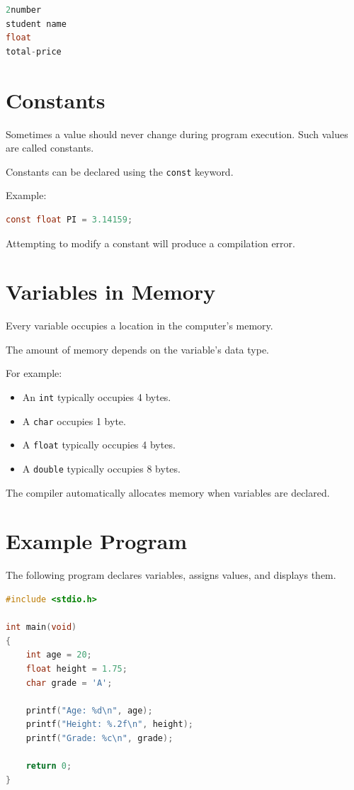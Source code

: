 \documentclass[12pt,openany]{book}
\begin{document}
\begin{lstlisting}[language=C]
2number
student name
float
total-price
\end{lstlisting}

\section{Constants}

Sometimes a value should never change during program execution. Such values are called constants.

Constants can be declared using the \texttt{const} keyword.

Example:

\begin{lstlisting}[language=C]
const float PI = 3.14159;
\end{lstlisting}

Attempting to modify a constant will produce a compilation error.

\section{Variables in Memory}

Every variable occupies a location in the computer's memory.

The amount of memory depends on the variable's data type.

For example:

\begin{itemize}
    \item An \texttt{int} typically occupies 4 bytes.
    \item A \texttt{char} occupies 1 byte.
    \item A \texttt{float} typically occupies 4 bytes.
    \item A \texttt{double} typically occupies 8 bytes.
\end{itemize}

The compiler automatically allocates memory when variables are declared.

\section{Example Program}

The following program declares variables, assigns values, and displays them.

\begin{lstlisting}[language=C]
#include <stdio.h>

int main(void)
{
    int age = 20;
    float height = 1.75;
    char grade = 'A';

    printf("Age: %d\n", age);
    printf("Height: %.2f\n", height);
    printf("Grade: %c\n", grade);

    return 0;
}
\end{lstlisting}
\end{document}
